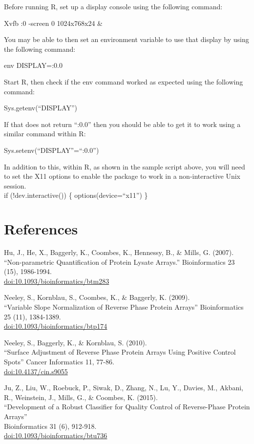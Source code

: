 \documentclass[
]{article}
\begin{document}
Before running R, set up a display console using the following command:

Xvfb :0 -screen 0 1024x768x24 \&

You may be able to then set an environment variable to use that display
by using the following command:

env DISPLAY=:0.0

Start R, then check if the env command worked as expected using the
following command:

Sys.getenv(``DISPLAY'')

If that does not return ``:0.0'' then you should be able to get it to
work using a similar command within R:

Sys.setenv(``DISPLAY''=``:0.0'')

In addition to this, within R, as shown in the sample script above, you
will need to set the X11 options to enable the package to work in a
non-interactive Unix session.\\
if (!dev.interactive()) \{ options(device=``x11'') \}

\hypertarget{references}{%
\section{References}\label{references}}

Hu, J., He, X., Baggerly, K., Coombes, K., Hennessy, B., \& Mills, G.
(2007).\\
``Non-parametric Quantification of Protein Lysate Arrays.''
Bioinformatics 23 (15), 1986-1994.\\
\href{https://academic.oup.com/bioinformatics/article/23/15/1986/205819}{doi:10.1093/bioinformatics/btm283}

Neeley, S., Kornblau, S., Coombes, K., \& Baggerly, K. (2009).\\
``Variable Slope Normalization of Reverse Phase Protein Arrays''
Bioinformatics 25 (11), 1384-1389.\\
\href{https://academic.oup.com/bioinformatics/article/25/11/1384/331482}{doi:10.1093/bioinformatics/btp174}

Neeley, S., Baggerly, K., \& Kornblau, S. (2010).\\
``Surface Adjustment of Reverse Phase Protein Arrays Using Positive
Control Spots'' Cancer Informatics 11, 77-86.\\
\href{https://journals.sagepub.com/doi/10.4137/CIN.S9055}{doi:10.4137/cin.s9055}

Ju, Z., Liu, W., Roebuck, P., Siwak, D., Zhang, N., Lu, Y., Davies, M.,
Akbani, R., Weinstein, J., Mills, G., \& Coombes, K. (2015).\\
``Development of a Robust Classifier for Quality Control of
Reverse-Phase Protein Arrays''\\
Bioinformatics 31 (6), 912-918.\\
\href{https://academic.oup.com/bioinformatics/article/31/6/912/214854}{doi:10.1093/bioinformatics/btu736}
\end{document}
